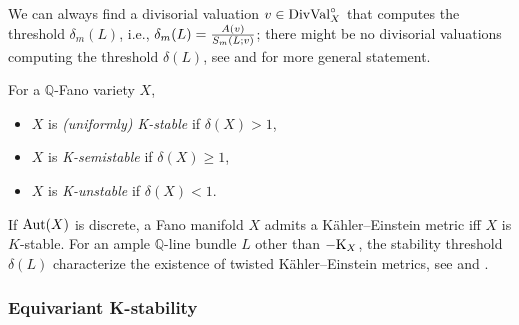 \begin{remark*}
	We can always find a divisorial valuation $v \in \mathrm{DivVal}^\circ_X$ that computes the threshold $\delta_m(L)$, i.e., $\delta_m(L) = {A(v) \over S_m(L; v)}$; there might be no divisorial valuations computing the threshold $\delta(L)$, see \cite[\S6]{BJ_thre_val_kst} and \cite{Xu_min_val_QM} for more general statement.
\end{remark*}

\begin{thmdefn}
	For a $\mathbb{Q}$-Fano variety $X$,
	\begin{itemize}
		\item $X$ is \emph{(uniformly) K-stable} if $\delta(X) > 1$,
		\item $X$ is \emph{K-semistable} if $\delta(X) \geq 1$,
		\item $X$ is \emph{K-unstable} if $\delta(X) < 1$.
	\end{itemize}
\end{thmdefn}
\begin{remark*}
	If $\mathrm{Aut}(X)$ is discrete, a Fano manifold $X$ admits a Kähler--Einstein metric iff $X$ is $K$-stable. For an ample $\mathbb{Q}$-line bundle $L$ other than $-\mathrm{K}_X$, the stability threshold $\delta(L)$ characterize the existence of twisted Kähler--Einstein metrics, see \cite{BBJ_variational_YTD} and \cite{RTZ_basis_div_bala_metr}.
\end{remark*}



\subsubsection{Equivariant K-stability}\label{sec:prelim:kstab:GKst}
